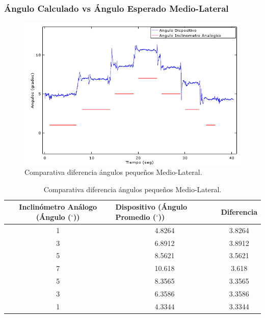 \documentclass[12pt,a4paper]{article}
\newcommand{\grad}{$^{\circ}$}
\begin{document}
\subsubsection{Ángulo Calculado vs Ángulo Esperado Medio-Lateral}
\begin{figure}[H]
	\centering
	\includegraphics[scale=0.89]{images/pruebas/Inclinometro/medioLateralB}
	\caption{Comparativa diferencia ángulos pequeños Medio-Lateral.}
	\label{fig:inclinometroVsDispositivoML}
\end{figure}

\begin{table}[H]
	\centering
	\caption{Comparativa diferencia ángulos pequeños Medio-Lateral.}
	\begin{tabular}{|c|c|c|}
		\hline
		\textbf{Inclinómetro Análogo (Ángulo (\grad))} & \multicolumn{1}{l|}{\textbf{Dispositivo (Ángulo Promedio (\grad))}} & Diferencia				 \\ \hline
		1                                      & 4.8264                                                      & 3.8264                     \\ \hline
		3                                      & 6.8912                                                      & 3.8912                     \\ \hline
		5                                      & 8.5621                                                      & 3.5621                     \\ \hline
		7                                      & 10.618                                                      & 3.618                      \\ \hline
		5                                      & 8.3565                                                      & 3.3565                     \\ \hline
		3                                      & 6.3586                                                      & 3.3586                     \\ \hline
		1                                      & 4.3344                                                      & 3.3344                     \\ \hline
	\end{tabular}		
	\label{table:inclinometroVsDispositivoML}
\end{table}
\end{document}
